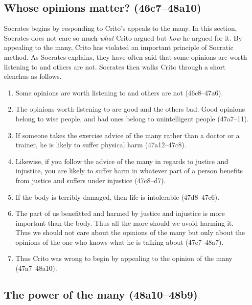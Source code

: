 \documentclass[11pt]{article}
\begin{document}
\subsection{Whose opinions matter? (46c7--48a10)}

Socrates begins by responding to Crito's appeals to the many.  In this section, Socrates does not care so much \emph{what} Crito argued but \emph{how} he argued for it.  By appealing to the many, Crito has violated an important principle of Socratic method.  As Socrates explains, they have often said that some opinions are worth listening to and others are not.  Socrates then walks Crito through a short elenchus as follows.

\begin{enumerate}
    \item Some opinions are worth listening to and others are not (46c8--47a6).
    \item The opinions worth listening to are good and the others bad.  Good opinions belong to wise people, and bad ones belong to unintelligent people (47a7--11).
    \item If someone takes the exercise advice of the many rather than a doctor or a trainer, he is likely to suffer physical harm (47a12--47c8).
    \item Likewise, if you follow the advice of the many in regards to justice and injustice, you are likely to suffer harm in whatever part of a person benefits from justice and suffers under injustice (47c8--d7).
    \item If the body is terribly damaged, then life is intolerable (47d8--47e6).
    \item The part of us benefitted and harmed by justice and injustice is more important than the body.  Thus all the more should we avoid harming it.  Thus we should not care about the opinions of the many but only about the opinions of the one who knows what he is talking about (47e7--48a7).
    \item Thus Crito was wrong to begin by appealing to the opinion of the many (47a7--48a10).
\end{enumerate}

\subsection{The power of the many (48a10--48b9)}
\end{document}
